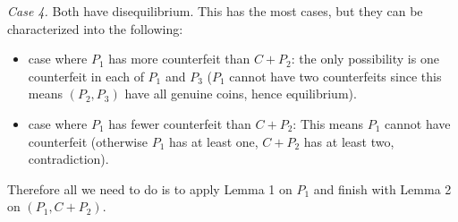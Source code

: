 \documentclass[11pt,a4paper]{article}
\begin{document}
\begin{enumerate}
    \emph{Case 4.} Both have disequilibrium. 
    This has the most cases, but they can be characterized into the following: 
    \begin{itemize}
    	\item 
    	case where $P_1$ has more counterfeit than $C+P_2$: 
    	the only possibility is one counterfeit in each of $P_1$ and $P_3$
    	($P_1$ cannot have two counterfeits since this means $(P_2, P_3)$ have all genuine coins, hence equilibrium). 
    	\item 
    	case where $P_1$ has fewer counterfeit than $C+P_2$: 
    	This means $P_1$ cannot have counterfeit (otherwise $P_1$ has at least one, $C+P_2$ has at least two, contradiction). 
    	
    \end{itemize}
    Therefore all we need to do is to apply Lemma 1 on $P_1$ and finish with Lemma 2 on $(P_1, C+P_2)$. 
    
\end{enumerate}
\end{document}
